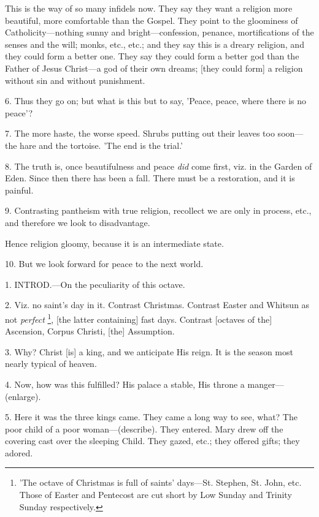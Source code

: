 This is the way of so many infidels now. They say
they want a religion more beautiful, more comfortable than the Gospel.
They point to the gloominess of Catholicity—nothing sunny and
bright—confession, penance, mortifications of the senses and the
will; monks, etc., etc.; and they say this is a dreary religion, and
they could form a better one. They say they could form a better god
than the Father of Jesus Christ—a god of their own dreams; [they
could form] a religion without sin and without punishment.

6. Thus they go on; but what is this but to say,
'Peace, peace, where there is no peace'?

7. The more haste, the worse speed. Shrubs
putting out their leaves too soon—the hare and the tortoise. 'The
end is the trial.'

8. The truth is, once beautifulness and peace \emph{did}
come first, viz. in the Garden of Eden. Since then there has been
a fall. There must be a restoration, and it is painful.

9. Contrasting pantheism with true religion,
recollect we are only in process, etc., and therefore we look to
disadvantage.

Hence religion gloomy, because it is an
intermediate state.

10. But we look forward for peace to the next
world.


1. INTROD.—On
the peculiarity of this octave.

2. Viz. no saint's day in it. Contrast Christmas.
Contrast Easter and Whitsun as not \emph{perfect} \footnote{'The octave of Christmas
is full of saints' days—St. Stephen, St. John, etc. Those of Easter
and Pentecost are cut short by Low Sunday and Trinity Sunday
respectively.}, [the latter containing] fast days. Contrast [octaves of the]
Ascension, Corpus Christi, [the] Assumption.

3. Why? Christ [is] a king, and we anticipate His
reign. It is the season most nearly typical of heaven.

4. Now, how was this fulfilled? His palace a
stable, His throne a manger—(enlarge).

5. Here it was the three kings came. They came a
long way to see, what? The poor child of a poor woman—(describe).
They entered. Mary drew off the covering cast over the sleeping Child.
They gazed, etc.; they offered gifts; they adored.

